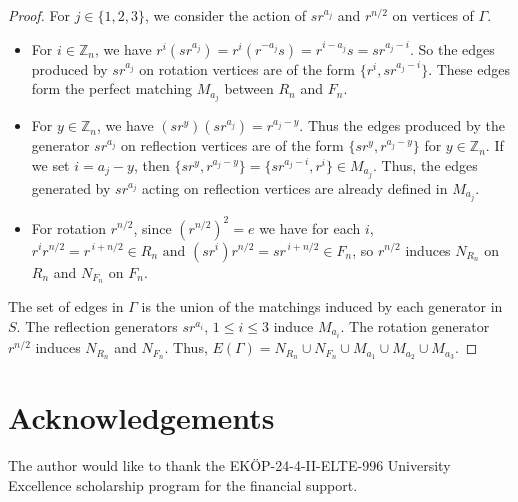 \documentclass[12pt,reqno,a4paper]{amsart}
\theoremstyle{definition}
\begin{document}
\begin{proof} 
For \(j\in \{1,2,3\}\), we consider the action of \(sr^{a_{j}}\) and $r^{n/2}$ on vertices of $\Gamma$.
\begin{itemize}
    \item For \(i\in \mathbb{Z}_{n}\), we have
    \(r^{i} (sr^{a_{j}})=r^{i}(r^{-a_{j}}s)=r^{i-a_{j}}s=sr^{a_{j}-i}\).    
     So the edges produced by \(sr^{a_{j}}\) on rotation vertices are of the form \(\{r^{i},sr^{a_{j}-i}\}\). These edges form the perfect matching \(M_{a_{j}}\) between \(R_{n}\) and \(F_{n}\).

     \item For $y\in \mathbb{Z}_{n}$, we have
       \((sr^{y}) (sr^{a_{j}})=r^{a_{j}-y}\). Thus the edges produced by the generator \(sr^{a_{j}}\) on reflection vertices are of the form \(\{sr^{y},r^{a_{j}-y}\}\) for $y\in \mathbb{Z}_{n}$. If we set \(i=a_{j}-y\), then 
       $\{sr^{y},r^{a_{j}-y}\}=\{sr^{a_{j}-i},r^{i}\}\in M_{a_{j}}$.
       Thus, the edges generated by \(sr^{a_{j}}\) acting on reflection vertices are already defined in \(M_{a_{j}}\).
       

     \item For rotation \(r^{n/2}\), since \((r^{n/2})^2=e\) we have for each \(i\),
     $r^i r^{n/2}=r^{\,i+n/2}\in R_{n} \text{ and } (sr^i) r^{n/2}=sr^{\,i+n/2}\in F_{n}$, so \(r^{n/2}\) induces \(N_{R_{n}}\) on \(R_{n}\) and \(N_{F_{n}}\) on \(F_{n}\).
\end{itemize}

The set of edges in \(\Gamma \) is the union of the matchings induced by each generator in \(S\). The reflection generators \(sr^{a_{i}}\), $1\leq i\leq 3$ induce $M_{a_{i}}$. The rotation generator \(r^{n/2}\) induces \(N_{R_{n}}\) and \(N_{F_{n}}\).
Thus,
$E(\Gamma)=N_{R_{n}}\cup N_{F_{n}}\cup M_{a_1}\cup M_{a_2}\cup M_{a_3}$.
 \end{proof}
\section{Acknowledgements} 
The author would like to thank the EK\"{O}P-24-4-II-ELTE-996 University Excellence scholarship program for the financial support.
\end{document}
